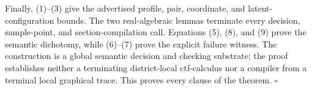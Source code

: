 Finally, (1)--(3) give the advertised profile, pair, coordinate, and latent-configuration bounds.  The two real-algebraic lemmas terminate every decision, sample-point, and section-compilation call.  Equations (5), (8), and (9) prove the semantic dichotomy, while (6)--(7) prove the explicit failure witness.  The construction is a global semantic decision and checking substrate; the proof establishes neither a terminating district-local ctf-calculus nor a compiler from a terminal local graphical trace.  This proves every clause of the theorem. \(\square\)